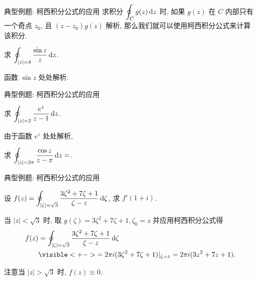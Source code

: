 \begin{frame}{典型例题: 柯西积分公式的应用}
\onslide<+->
求积分 $\displaystyle\oint_C g(z)\,\mathrm{d} z$ 时, 如果 $g(z)$ 在 $C$ 内部只有一个奇点 $z_0$, 且 $(z-z_0)g(z)$ 解析, 那么我们就可以使用柯西积分公式来计算该积分.
\onslide<+->
\begin{example}
求 $\displaystyle\oint_{|z|=4}\frac{\sin z}z\,\mathrm{d} z$.
\end{example}
\onslide<+->
\begin{solution}
函数 $\sin z$ 处处解析.
\vspace{-.5\baselineskip}
\end{solution}
\end{frame}


\begin{frame}[<*>]{典型例题: 柯西积分公式的应用}
\onslide<+->
\begin{example}
求 $\displaystyle\oint_{|z|=2}\frac{e^z}{z-1}\,\mathrm{d} z$.
\end{example}

\onslide<+->
\begin{solution}
由于函数 $e^z$ 处处解析,
\end{solution}

\onslide<+->
\begin{exercise}
求 $\displaystyle\oint_{|z|=2\pi}\frac{\cos z}{z-\pi}\,\mathrm{d} z=$.
\end{exercise}
\end{frame}


\begin{frame}{典型例题: 柯西积分公式的应用}
\onslide<+->
\begin{example}
设 $f(z)=\displaystyle\oint_{|\zeta|=\sqrt3}\frac{3\zeta^2+7\zeta+1}{\zeta-z}\,\mathrm{d} \zeta$, 求 $f'(1+i)$.
\end{example}
\onslide<+->
\begin{solution}
当 $|z|<\sqrt3$ 时, 取 $g(\zeta)=3\zeta^2+7\zeta+1, \zeta_0=z$ 并应用柯西积分公式得
\vspace{-\baselineskip}
\begin{align*}
f(z)&=\oint_{|\zeta|=\sqrt3}\frac{3\zeta^2+7\zeta+1}{\zeta-z}\diff \zeta\\
&\visible<+->{=2\pi i(3\zeta^2+7\zeta+1)|_{\zeta=z}=2\pi i(3z^2+7z+1).}
\end{align*}
\vspace{-1.2\baselineskip}
\vspace{-\baselineskip}
\onslide<+->{\[f'(1+i)=2\pi i(13+6i)=-12\pi+26\pi i.\]}
\vspace{-\baselineskip}
\end{solution}
\onslide<+->
注意当 $|z|>\sqrt3$ 时, $f(z)\equiv0$.
\end{frame}


